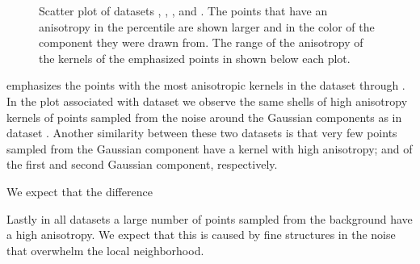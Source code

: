 \begin{figure}
\begin{subfigure}{0.23\textwidth}
					\caption{}
					\label{fig:discussion:anisotropy:baakman3}
				\end{subfigure}			
				\caption{Scatter plot of datasets
					 \ferdosiTwo, %
					 \baakmanTwo, %
					 \ferdosiThree, and %
					 \baakmanThree. %
					The points that have an anisotropy in the  percentile are shown larger and in the color of the component they were drawn from. The range of the anisotropy of the kernels of the emphasized points in shown below each plot.}
				\label{fig:discussion:anisotropy:multisphere}
			\end{figure}			
			 emphasizes the points with the most anisotropic kernels in the dataset \ferdosiTwo through \baakmanThree. 
				In the plot associated with dataset \ferdosiTwo we observe the same shells of high anisotropy kernels of points sampled from the noise around the Gaussian components as in dataset \ferdosiOne. Another similarity between these two datasets is that very few points sampled from the Gaussian component have a kernel with high anisotropy;  and  of the first and second Gaussian component, respectively. 


				We expect that the difference








		Lastly in all datasets a large number of points sampled from the background have a high anisotropy. We expect that this is caused by fine structures in the noise that overwhelm the local neighborhood.



